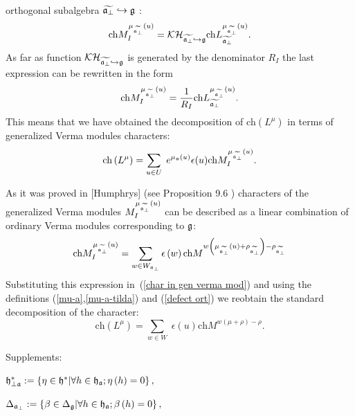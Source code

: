 \documentclass[12pt]{article}
\theoremstyle{definition}
\begin{document}
orthogonal subalgebra $\widetilde{\frak{a}_{\perp }}\hookrightarrow \frak{g}$%
:
\[
\mathrm{ch}M_{I}^{\mu _{\widetilde{\frak{a}_{\perp }}}\left( u\right) }=%
\mathcal{KH}_{\widetilde{\frak{a}_{\perp }}\hookrightarrow \frak{g}}\mathrm{%
ch}L_{\widetilde{\frak{a}_{\perp }}}^{\mu _{\widetilde{\frak{a}_{\perp }}%
}\left( u\right) }.
\]
As far as function $\mathcal{KH}_{\widetilde{\frak{a}_{\perp }}%
\hookrightarrow \frak{g}}$ is generated by the denominator $R_{I}$ the last
expression can be rewritten in the form
\[
\mathrm{ch}M_{I}^{\mu _{\widetilde{\frak{a}_{\perp }}}\left( u\right) }=%
\frac{1}{R_{I}}\mathrm{ch}L_{\widetilde{\frak{a}_{\perp }}}^{\mu _{%
\widetilde{\frak{a}_{\perp }}}\left( u\right) }.
\]
This means that we have obtained the decomposition of $\mathrm{ch}\left(
L^{\mu }\right) $ in terms of generalized Verma modules characters:
\begin{equation}
\mathrm{ch}\left( L^{\mu }\right) =\sum_{u\in U}\;e^{\mu _{\frak{a}}\left(
u\right) }\epsilon (u)\mathrm{ch}M_{I}^{\mu _{\widetilde{\frak{a}_{\perp }}%
}\left( u\right) }.  \label{char in gen verma mod}
\end{equation}

As it was proved in [Humphrys] (see Proposition 9.6 ) characters of the
generalized Verma modules $M_{I}^{\mu _{\widetilde{\frak{a}_{\perp }}}\left(
u\right) }$  can be described as a linear combination of ordinary Verma
modules corresponding to $\frak{g}$:
\[
\mathrm{ch}M_{I}^{\mu _{\widetilde{\frak{a}_{\perp }}}\left( u\right)
}=\sum_{w\in W_{\frak{a}_{\perp }}}\epsilon \left( w\right) \mathrm{ch}%
M^{w\left( \mu _{\widetilde{\frak{a}_{\perp }}}\left( u\right) +\rho _{%
\widetilde{\frak{a}_{\perp }}}\right) -\rho _{\widetilde{\frak{a}_{\perp }}}}
\]
Substituting this expression in\ (\ref{char in gen verma mod}) and using the
definitions (\ref{mu-a},\ref{mu-a-tilda}) and (\ref{defect ort}) we reobtain
the standard decomposition of the character:
\[
\mathrm{ch}\left( L^{\mu }\right) =\sum_{w\in W}\;\epsilon (u)\mathrm{ch}%
M^{w\left( \mu +\rho \right) -\rho }.
\]

\bigskip

\bigskip Supplements:

\bigskip $\frak{h}_{\perp \frak{a}}^{\ast }:=\left\{ \eta \in \frak{h}^{\ast
}|\forall h\in \frak{h}_{\frak{a}};\eta \left( h\right) =0\right\} ,$

$\Delta _{\frak{a}_{\perp }}:=\left\{ \beta \in \Delta _{\frak{g}}|\forall
h\in \frak{h}_{\frak{a}};\beta \left( h\right) =0\right\} ,$
\end{document}
